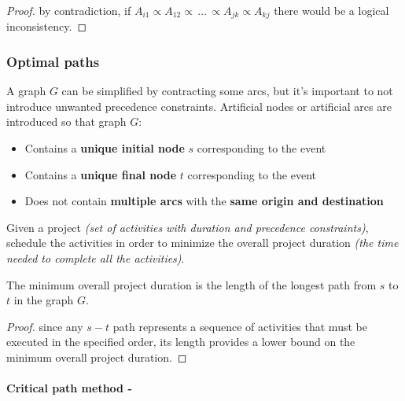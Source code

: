 \documentclass[english]{article}
\begin{document}
\begin{proof}
  by contradiction, if \(A_{i1} \propto A_{12} \propto \, \ldots \, \propto A_{jk} \propto A_{kj}\) there would be a logical inconsistency.
\end{proof}

\subsubsection{Optimal paths}

A graph \(G\) can be simplified by contracting some arcs, but it's important to not introduce unwanted precedence constraints.
Artificial nodes or artificial arcs are introduced so that graph \(G\):

\begin{itemize}
  \item Contains a \textbf{unique initial node} \(s\) corresponding to the event 
  \item Contains a \textbf{unique final node} \(t\) corresponding to the event 
  \item Does not contain \textbf{multiple arcs} with the \textbf{same origin and destination}
\end{itemize}

\bigskip
\begin{problem}
Given a project \textit{(set of activities with duration and precedence constraints)}, schedule the activities in order to minimize the overall project duration \textit{(the time needed to complete all the activities)}.
\end{problem}

\bigskip
\begin{property}
  The minimum overall project duration is the length of the longest path from \(s\) to \(t\) in the graph \(G\).
\end{property}

\begin{proof}
  since any \(s-t\) path represents a sequence of activities that must be executed in the specified order, its length provides a lower bound on the minimum overall project duration.
\end{proof}

\paragraph{Critical path method - \CPM}
\end{document}
